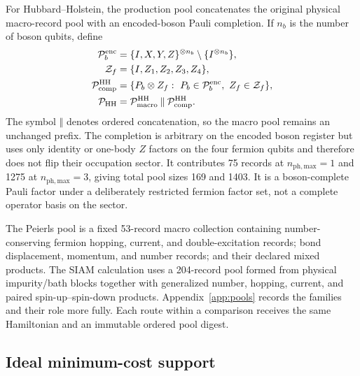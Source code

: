 \documentclass[
  reprint,
  amsmath,
  amssymb,
  aps,
  pra,
  nofootinbib,
  superscriptaddress,
  floatfix
]{revtex4-2}
\newcommand{\phmax}{n_{\mathrm{ph,max}}}
\begin{document}
For Hubbard--Holstein, the production pool concatenates the original
physical macro-record pool with an encoded-boson Pauli completion.  If $n_b$
is the number of boson qubits, define
\begin{align}
 \mathcal P_b^{\rm enc}
 &=\{I,X,Y,Z\}^{\otimes n_b}
   \setminus\{I^{\otimes n_b}\},
 \nonumber\\
 \mathcal Z_f&=\{I,Z_1,Z_2,Z_3,Z_4\},
 \label{eq:hh_completion_factors}\\
 \mathcal P_{\rm comp}^{\rm HH}
 &=\{P_b\otimes Z_f:\
     P_b\in\mathcal P_b^{\rm enc},\
     Z_f\in\mathcal Z_f\},
 \label{eq:hh_completion_pool}\\
 \mathcal P_{\rm HH}
 &=\mathcal P_{\rm macro}^{\rm HH}\mathbin{\Vert}
   \mathcal P_{\rm comp}^{\rm HH}.
 \label{eq:hh_production_pool}
\end{align}
The symbol $\Vert$ denotes ordered concatenation, so the macro pool remains
an unchanged prefix.  The completion is arbitrary on the encoded boson
register but uses only identity or one-body $Z$ factors on the four fermion
qubits and therefore does not flip their occupation sector.  It contributes
75 records at $\phmax=1$ and 1275 at $\phmax=3$, giving total pool sizes
169 and 1403.  It is a boson-complete Pauli factor under a deliberately
restricted fermion factor set, not a complete operator basis on the sector.

The Peierls pool is a fixed 53-record macro collection containing
number-conserving fermion hopping, current, and double-excitation records;
bond displacement, momentum, and number records; and their declared mixed
products.  The SIAM calculation uses a 204-record pool formed from physical
impurity/bath blocks together with generalized number, hopping, current, and
paired spin-up--spin-down products.  Appendix~\ref{app:pools} records the
families and their role more fully.  Each route within a comparison receives
the same Hamiltonian and an immutable ordered pool digest.

\subsection{Ideal minimum-cost support}
\label{sec:ideal_construction}
\end{document}

